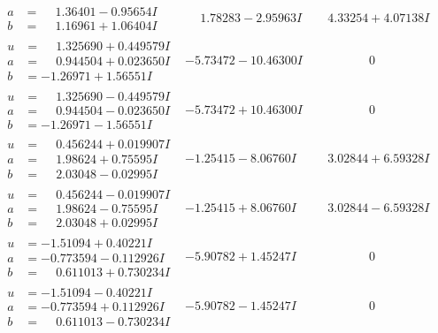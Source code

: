 \documentclass[1p]{elsarticle_modified}
\theoremstyle{definition}
\begin{document}
$$\begin{array}{c|c|c}
\begin{aligned}
a &= \phantom{-}1.36401 - 0.95654 I \\
b &= \phantom{-}1.16961 + 1.06404 I\end{aligned}
 & \phantom{-}1.78283 - 2.95963 I & \phantom{-}4.33254 + 4.07138 I \\ \hline\begin{aligned}
u &= \phantom{-}1.325690 + 0.449579 I \\
a &= \phantom{-}0.944504 + 0.023650 I \\
b &= -1.26971 + 1.56551 I\end{aligned}
 & -5.73472 - 10.46300 I & \phantom{-0.000000 } 0 \\ \hline\begin{aligned}
u &= \phantom{-}1.325690 - 0.449579 I \\
a &= \phantom{-}0.944504 - 0.023650 I \\
b &= -1.26971 - 1.56551 I\end{aligned}
 & -5.73472 + 10.46300 I & \phantom{-0.000000 } 0 \\ \hline\begin{aligned}
u &= \phantom{-}0.456244 + 0.019907 I \\
a &= \phantom{-}1.98624 + 0.75595 I \\
b &= \phantom{-}2.03048 - 0.02995 I\end{aligned}
 & -1.25415 - 8.06760 I & \phantom{-}3.02844 + 6.59328 I \\ \hline\begin{aligned}
u &= \phantom{-}0.456244 - 0.019907 I \\
a &= \phantom{-}1.98624 - 0.75595 I \\
b &= \phantom{-}2.03048 + 0.02995 I\end{aligned}
 & -1.25415 + 8.06760 I & \phantom{-}3.02844 - 6.59328 I \\ \hline\begin{aligned}
u &= -1.51094 + 0.40221 I \\
a &= -0.773594 - 0.112926 I \\
b &= \phantom{-}0.611013 + 0.730234 I\end{aligned}
 & -5.90782 + 1.45247 I & \phantom{-0.000000 } 0 \\ \hline\begin{aligned}
u &= -1.51094 - 0.40221 I \\
a &= -0.773594 + 0.112926 I \\
b &= \phantom{-}0.611013 - 0.730234 I\end{aligned}
 & -5.90782 - 1.45247 I & \phantom{-0.000000 } 0 \\ \hline\begin{aligned}

\end{aligned}
\end{array}$$
\end{document}
